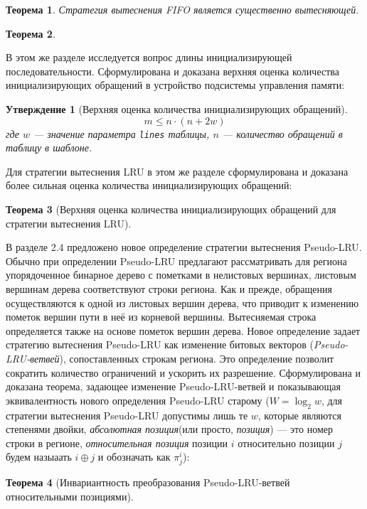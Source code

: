 \documentclass[14pt,autoref,href
,facsimile
]{disser}
\newtheorem{utv}{Утверждение}
\newtheorem{theorem}{Теорема}
\newcommand{\LRU}{LRU\xspace}
\newcommand{\PseudoLRU}{Pseudo-LRU\xspace}
\begin{document}
\begin{theorem}
  Стратегия вытеснения FIFO является существенно вытесняющей.
\end{theorem}

\begin{theorem}\label{thm:PseudoLRU_essential} \PseudoLRUEssential \end{theorem}

В этом же разделе исследуется вопрос длины инициализирующей последовательности. Сформулирована и доказана верхняя оценка количества инициализирующих обращений в устройство подсистемы управления памяти:
\begin{utv}[Верхняя оценка количества инициализирующих обращений]
$$m \leqslant n \cdot (n + 2w)$$ где $w$ --- значение параметра \texttt{lines} таблицы, $n$ --- количество обращений в таблицу в шаблоне.
\end{utv}

Для стратегии вытеснения LRU в этом же разделе сформулирована и доказана более сильная оценка количества инициализирующих обращений:
\begin{theorem}[Верхняя оценка количества инициализирующих обращений для
стратегии вытеснения \LRU]\label{thm_mirror_lenth_lru} \UpperBoundLRUMirror
\end{theorem}

В разделе 2.4 предложено новое определение стратегии вытеснения \PseudoLRU. Обычно при определении \PseudoLRU предлагают рассматривать для региона упорядоченное бинарное дерево с пометками в нелистовых вершинах, листовым вершинам дерева соответствуют строки региона. Как и прежде, обращения осуществляются к одной из листовых вершин дерева, что приводит к изменению пометок вершин пути в неё из корневой вершины. Вытесняемая строка определяется также на основе пометок вершин дерева. Новое определение задает стратегию вытеснения \PseudoLRU как изменение битовых векторов (\emph{\PseudoLRU-ветвей}), сопоставленных строкам региона. Это определение позволит сократить количество ограничений и ускорить их разрешение. Сформулирована и доказана теорема, задающее изменение \PseudoLRU-ветвей и показывающая эквивалентность нового определения \PseudoLRU старому ($W = \log_2 w$, для стратегии вытеснения \PseudoLRU допустимы лишь те $w$, которые являются степенями двойки, \emph{абсолютная позиция}(или просто, \emph{позиция}) --- это номер строки в регионе, \emph{относительная позиция} позиции $i$ относительно позиции $j$ будем назыаать $i \oplus j$ и обозначать как $\pi_j^i$):
\begin{theorem}[Инвариантность преобразования \PseudoLRU-ветвей относительными
позициями]\label{thm_pseudoLRU_invariant} \PseudoLRUInvariant
\end{theorem}
\end{document}
